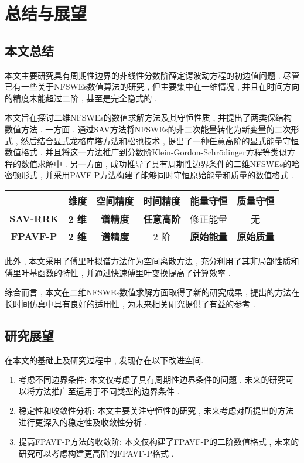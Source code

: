 
\chapter[总结与展望]{总结与展望}
\section{本文总结}
本文主要研究具有周期性边界的非线性分数阶薛定谔波动方程的初边值问题 . 尽管已有一些关于NFSWEs数值算法的研究 , 但主要集中在一维情况 , 并且在时间方向的精度未能超过二阶 , 甚至是完全隐式的 . 

本文旨在探讨二维NFSWEs的数值求解方法及其守恒性质 , 并提出了两类保结构数值方法 . 一方面 , 通过SAV方法将NFSWEs的非二次能量转化为新变量的二次形式 , 然后结合显式龙格库塔方法和松弛技术 , 提出了一种任意高阶的显式能量守恒数值格式 . 并且将这一方法推广到分数阶Klein-Gordon-Schr{\"o}dinger方程等类似方程的数值求解中 . 另一方面 , 成功推导了具有周期性边界条件的二维NFSWEs的哈密顿形式 , 并采用PAVF-P方法构建了能够同时守恒原始能量和质量的数值格式 . 

\begin{table}[H]
    \centering
      \begin{tabular}{cccccc}
      \toprule
      \textcolor[rgb]{0 , 0 , 0}{} & \textcolor[rgb]{0 , 0 , 0}{\textbf{维度}} & \textcolor[rgb]{0 , 0 , 0}{\textbf{空间精度}} & \textcolor[rgb]{0 , 0 , 0}{\textbf{时间精度}} & \textcolor[rgb]{0 , 0 , 0}{\textbf{能量守恒}} & \textcolor[rgb]{0 , 0 , 0}{\textbf{质量守恒}} \\
      \midrule
      \textcolor[rgb]{0 , 0 , 0}{\textbf{SAV-RRK}} & \textbf{2 维}   & \textbf{谱精度}   & \textbf{任意高阶}  & 修正能量  & 无 \\
      \midrule
      \textcolor[rgb]{0 , 0 , 0}{\textbf{FPAVF-P}} & \textbf{2 维}   & \textbf{谱精度}   & 2 阶   & \textbf{原始能量}  & \textbf{原始质量} \\
      \bottomrule
      \end{tabular}%
    \label{tab:3}%
  \end{table}%

此外 , 本文采用了傅里叶拟谱方法作为空间离散方法 , 充分利用了其非局部性质和傅里叶基函数的特性 , 并通过快速傅里叶变换提高了计算效率 . 

综合而言 , 本文在二维NFSWEs数值求解方面取得了新的研究成果 , 提出的方法在长时间仿真中具有良好的适用性 , 为未来相关研究提供了有益的参考 . 

\section{研究展望}
在本文的基础上及研究过程中 , 发现存在以下改进空间.

\begin{enumerate}[(1)]
    \item 考虑不同边界条件: 本文仅考虑了具有周期性边界条件的问题 , 未来的研究可以将方法推广至适用于不同类型的边界条件 .
    \item 稳定性和收敛性分析: 本文主要关注守恒性的研究 , 未来考虑对所提出的方法进行更深入的稳定性及收敛性分析 . 
    \item 提高FPAVF-P方法的收敛阶: 本文仅构建了FPAVF-P的二阶数值格式 , 未来的研究可以考虑构建更高阶的FPAVF-P格式 . 
\end{enumerate}
